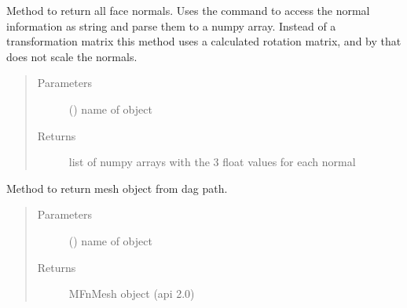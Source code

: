 \documentclass[letterpaper,10pt,english]{sphinxmanual}
\begin{document}
\begin{fulllineitems}
\label{\detokenize{pk_src.misc:pk_src.misc.getFaceNormals2}}
Method to return all face normals. Uses the command
to access the normal information as string and parse them to a numpy array.
Instead of a transformation matrix this method uses a calculated rotation matrix, and by that does not scale
the normals.
\begin{quote}\begin{description}
\item[{Parameters}] \leavevmode
{} () \textendash{} name of object

\item[{Returns}] \leavevmode
list of numpy arrays with the 3 float values for each normal

\end{description}\end{quote}
\begin{description}
\item[{}] \leavevmode
\begin{sphinxVerbatim}[commandchars=\\\{\}]
   
\end{sphinxVerbatim}

\end{description}

\end{fulllineitems}


\begin{fulllineitems}
\label{\detokenize{pk_src.misc:pk_src.misc.getMesh}}
Method to return mesh object from dag path.
\begin{quote}\begin{description}
\item[{Parameters}] \leavevmode
{} () \textendash{} name of object

\item[{Returns}] \leavevmode
MFnMesh object (api 2.0)

\end{description}\end{quote}

\end{fulllineitems}
\end{document}
